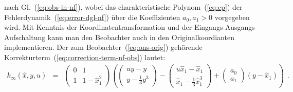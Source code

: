 nach Gl.~(\ref{eq:obs-in-nf}), wobei das charakteristische Polynom~(\ref{eq:cp})
der Fehlerdynamik~(\ref{eq:error-dgl-nf}) über die Koeffizienten
$a_{0},a_{1}>0$ vorgegeben wird. Mit Kenntnis der Koordinatentransformation
und der Eingangs-Ausgangs-Aufschaltung kann man den Beobachter auch
in den Originalkoordianten implementieren. Der zum Beobachter~(\ref{eq:ons-orig})
gehörende Korrekturterm~(\ref{eq:correction-term-nf-obs}) lautet:
\begin{equation}
\begin{array}{lcl}
k_{\infty}(\hat{x},y,u) & = & \left(\begin{array}{cc}
0 & 1\\
1 & 1-\hat{x}_{1}^{2}
\end{array}\right)\left(\left(\begin{array}{c}
uy-y\\
y-\frac{1}{3}y^{3}
\end{array}\right)\!-\!\left(\begin{array}{c}
u\hat{x}_{1}-\hat{x}_{1}\\
\hat{x}_{1}-\frac{1}{3}\hat{x}_{1}^{3}
\end{array}\right)+\left(\begin{array}{c}
a_{0}\\
a_{1}
\end{array}\right)(y-\hat{x}_{1})\right)\end{array}\!.\label{eq:vdp-kinf}
\end{equation}

